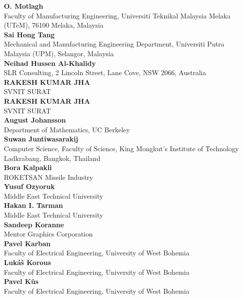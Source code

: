 \documentclass[article,A4,11pt]{llncs}%
\begin{document}
        \noindent
    {\bf O. Motlagh}\\
    Faculty of Manufacturing Engineering, Universiti Teknikal Malaysia Melaka (UTeM), 76100 Melaka, Malaysia\\
        \noindent
    {\bf Sai Hong Tang}\\
    Mechanical and Manufacturing Engineering Department, Universiti Putra Malaysia (UPM), Selangor, Malaysia\\
        \noindent
    {\bf Neihad Hussen Al-Khalidy}\\
    SLR Consulting, 2 Lincoln Street, Lane Cove, NSW 2066, Australia\\
        \noindent
    {\bf RAKESH KUMAR JHA}\\
    SVNIT SURAT\\
        \noindent
    {\bf RAKESH KUMAR JHA}\\
    SVNIT SURAT\\
        \noindent
    {\bf August Johansson}\\
    Department of Mathematics, UC Berkeley\\
        \noindent
    {\bf Suwan Juntiwasarakij}\\
    Computer Science, Faculty of Science, King Mongkut's Institute of Technology Ladkrabang, Bangkok, Thailand\\
        \noindent
    {\bf Bora Kalpakli}\\
    ROKETSAN Missile Industry\\
        \noindent
    {\bf Yusuf Ozyoruk}\\
    Middle East Technical University\\
        \noindent
    {\bf Hakan I. Tarman}\\
    Middle East Technical University\\
        \noindent
    {\bf Sandeep Koranne}\\
    Mentor Graphics Corporation\\
        \noindent
    {\bf Pavel Karban}\\
    Faculty of Electrical Engineering, University of West Bohemia\\
        \noindent
    {\bf Lukáš Korous}\\
    Faculty of Electrical Engineering, University of West Bohemia\\
        \noindent
    {\bf Pavel Kůs}\\
    Faculty of Electrical Engineering, University of West Bohemia\\
        \noindent
\end{document}
